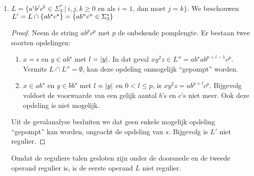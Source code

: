 \documentclass[a4paper]{article}
\begin{document}
\begin{question}
\begin{answer}
\begin{enumerate}
\begin{proof}
  Neem de string $0^p10^p$ met $p$ de onbekende pomplengte. Voor elke opdeling $s=xyz$ geldt dat $y\in 00^{\star}$ en $l=\abs{y}$ met $0<l\leq p$. Bijgevolg is $xy^2z=0^{p+l}10^p\notin L'$, ongeacht de opdeling van $s$. Bijgevolg is $L'$ niet regulier.
 \end{proof}
 Omdat het complement gesloten is onder reguliere talen is $L$ bijgevolg niet regulier.
 \item $L=\{ a^ib^jc^k \in \Sigma_3^* \ | \ \mbox{$i,j,k \geq 0$ en als $i = 1$, dan moet $j=k$} \}$. We beschouwen $L'=L\cap\left\{ ab^{\star}c^{\star} \right\}=\left\{ ab^nc^n \in \Sigma_3^* \right\}$
 \begin{proof}
  Neem de string $ab^pc^p$ met $p$ de onbekende pomplengte. Er bestaan twee soorten opdelingen:
  \begin{enumerate}
   \item $x=\epsilon$ en $y\in ab^{\star}$ met $l=\abs{y}$. In dat geval $xy^2z\in L''=ab^{\star}ab^{p+l-1}c^{p}$. Vermits $L\cap L''=\emptyset$, kan deze opdeling onmogelijk ``gepompt'' worden.
   \item $x\in ab^{\star}$ en $y\in bb^{\star}$ met $l=\abs{y}$ en $0<l\leq p$, is $xy^2z=ab^{p+l}c^{p}$. Bijgevolg voldoet de voorwaarde van een gelijk aantal $b$'s en $c$'s niet meer. Ook deze opdeling is niet mogelijk.
  \end{enumerate}
  Uit de gevalanalyse besluiten we dat geen enkele mogelijk opdeling ``gepompt'' kan worden, ongeacht de opdeling van $s$. Bijgevolg is $L'$ niet regulier.
 \end{proof}
 Omdat de reguliere talen gesloten zijn onder de doorsnede en de tweede operand regulier is, is de eerste operand $L$ niet regulier.
\end{enumerate}
\end{answer}
\end{question}
\end{document}
